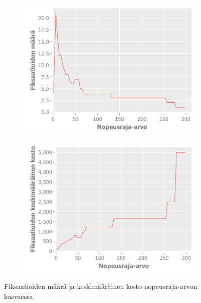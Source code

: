 \begin{figure}[H]
		\begin{subfigure}{.5\textwidth}
    \includegraphics[width=1.0\textwidth]{velocity-threshold-chart.png}
		\end{subfigure}%
		\begin{subfigure}{.5\textwidth}
    \includegraphics[width=1.0\textwidth]{velocity-threshold-avg-chart.png}
		\end{subfigure}%
		
		\caption{Fiksaatioiden määrä ja keskimääräinen kesto nopeusraja-arvon kasvaessa}
		\label{fig:velocity-threshold-avg-chart}
\end{figure}

\label{sec:esimluku}

